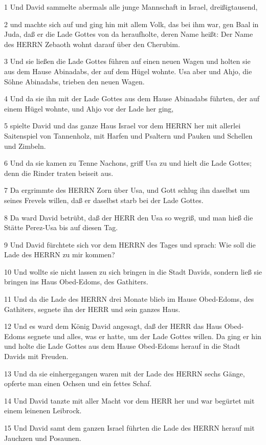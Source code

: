 \par 1 Und David sammelte abermals alle junge Mannschaft in Israel, dreißigtausend,
\par 2 und machte sich auf und ging hin mit allem Volk, das bei ihm war, gen Baal in Juda, daß er die Lade Gottes von da heraufholte, deren Name heißt: Der Name des HERRN Zebaoth wohnt darauf über den Cherubim.
\par 3 Und sie ließen die Lade Gottes führen auf einen neuen Wagen und holten sie aus dem Hause Abinadabs, der auf dem Hügel wohnte. Usa aber und Ahjo, die Söhne Abinadabs, trieben den neuen Wagen.
\par 4 Und da sie ihn mit der Lade Gottes aus dem Hause Abinadabs führten, der auf einem Hügel wohnte, und Ahjo vor der Lade her ging,
\par 5 spielte David und das ganze Haus Israel vor dem HERRN her mit allerlei Saitenspiel von Tannenholz, mit Harfen und Psaltern und Pauken und Schellen und Zimbeln.
\par 6 Und da sie kamen zu Tenne Nachons, griff Usa zu und hielt die Lade Gottes; denn die Rinder traten beiseit aus.
\par 7 Da ergrimmte des HERRN Zorn über Usa, und Gott schlug ihn daselbst um seines Frevels willen, daß er daselbst starb bei der Lade Gottes.
\par 8 Da ward David betrübt, daß der HERR den Usa so wegriß, und man hieß die Stätte Perez-Usa bis auf diesen Tag.
\par 9 Und David fürchtete sich vor dem HERRN des Tages und sprach: Wie soll die Lade des HERRN zu mir kommen?
\par 10 Und wollte sie nicht lassen zu sich bringen in die Stadt Davids, sondern ließ sie bringen ins Haus Obed-Edoms, des Gathiters.
\par 11 Und da die Lade des HERRN drei Monate blieb im Hause Obed-Edoms, des Gathiters, segnete ihn der HERR und sein ganzes Haus.
\par 12 Und es ward dem König David angesagt, daß der HERR das Haus Obed-Edoms segnete und alles, was er hatte, um der Lade Gottes willen. Da ging er hin und holte die Lade Gottes aus dem Hause Obed-Edoms herauf in die Stadt Davids mit Freuden.
\par 13 Und da sie einhergegangen waren mit der Lade des HERRN sechs Gänge, opferte man einen Ochsen und ein fettes Schaf.
\par 14 Und David tanzte mit aller Macht vor dem HERR her und war begürtet mit einem leinenen Leibrock.
\par 15 Und David samt dem ganzen Israel führten die Lade des HERRN herauf mit Jauchzen und Posaunen.
